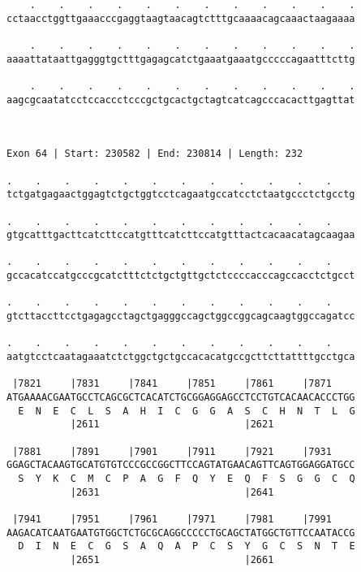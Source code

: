 \documentclass{article}
\begin{document}
\begin{Verbatim}
    .    .    .    .    .    .    .    .    .    .    .    .
cctaacctggttgaaacccgaggtaagtaacagtctttgcaaaacagcaaactaagaaaa
                                                            
    .    .    .    .    .    .    .    .    .    .    .    .
aaaattataattgagggtgctttgagagcatctgaaatgaaatgcccccagaatttcttg
                                                            
    .    .    .    .    .    .    .    .    .    .    .    .
aagcgcaatatcctccaccctcccgctgcactgctagtcatcagcccacacttgagttat
                                                            
                                                            
 
Exon 64 | Start: 230582 | End: 230814 | Length: 232
 
.    .    .    .    .    .    .    .    .    .    .    .    
tctgatgagaactggagtctgctggtcctcagaatgccatcctctaatgccctctgcctg
                                                            
.    .    .    .    .    .    .    .    .    .    .    .    
gtgcatttgacttcatcttccatgtttcatcttccatgtttactcacaacatagcaagaa
                                                            
.    .    .    .    .    .    .    .    .    .    .    .    
gccacatccatgcccgcatctttctctgctgttgctctccccacccagccacctctgcct
                                                            
.    .    .    .    .    .    .    .    .    .    .    .    
gtcttaccttcctgagagcctagctgagggccagctggccggcagcaagtggccagatcc
                                                            
.    .    .    .    .    .    .    .    .    .    .    .    
aatgtcctcaatagaaatctctggctgctgccacacatgccgcttcttattttgcctgca
                                                            
 |7821     |7831     |7841     |7851     |7861     |7871    
ATGAAAACGAATGCCTCAGCGCTCACATCTGCGGAGGAGCCTCCTGTCACAACACCCTGG
  E  N  E  C  L  S  A  H  I  C  G  G  A  S  C  H  N  T  L  G
           |2611                         |2621              
  
 |7881     |7891     |7901     |7911     |7921     |7931    
GGAGCTACAAGTGCATGTGTCCCGCCGGCTTCCAGTATGAACAGTTCAGTGGAGGATGCC
  S  Y  K  C  M  C  P  A  G  F  Q  Y  E  Q  F  S  G  G  C  Q
           |2631                         |2641              
  
 |7941     |7951     |7961     |7971     |7981     |7991    
AAGACATCAATGAATGTGGCTCTGCGCAGGCCCCCTGCAGCTATGGCTGTTCCAATACCG
  D  I  N  E  C  G  S  A  Q  A  P  C  S  Y  G  C  S  N  T  E
           |2651                         |2661              
  

\end{Verbatim}
\end{document}
